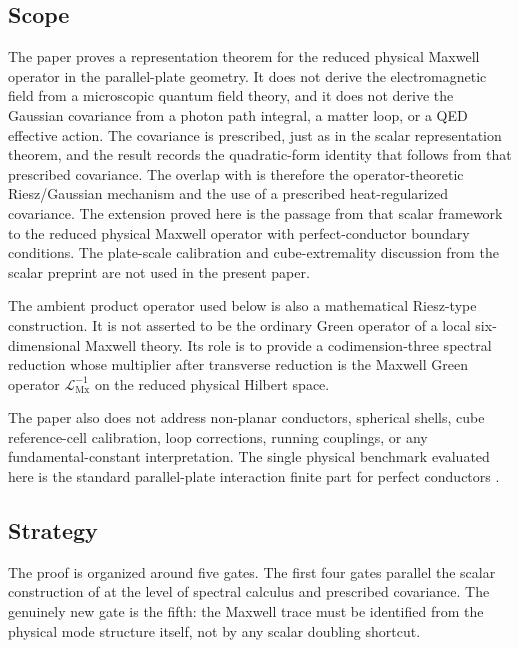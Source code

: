\documentclass[11pt]{article}
\providecommand{\LMx}{\mathcal L_{\mathrm{Mx}}}
\numberwithin{equation}{section}
\begin{document}
\subsection{Scope}
\label{subsec:scope}

The paper proves a representation theorem for the reduced physical Maxwell
operator in the parallel-plate geometry.  It does not derive the electromagnetic
field from a microscopic quantum field theory, and it does not derive the
Gaussian covariance from a photon path integral, a matter loop, or a QED
effective action.  The covariance is prescribed, just as in the scalar
representation theorem, and the result records the quadratic-form identity that
follows from that prescribed covariance.
The overlap with \cite{KhanKhan2026Scalar} is therefore the operator-theoretic
Riesz/Gaussian mechanism and the use of a prescribed heat-regularized
covariance.  The extension proved here is the passage from that scalar
framework to the reduced physical Maxwell operator with perfect-conductor
boundary conditions.  The plate-scale calibration and cube-extremality
discussion from the scalar preprint are not used in the present paper.

The ambient product operator used below is also a mathematical Riesz-type
construction.  It is not asserted to be the ordinary Green operator of a local
six-dimensional Maxwell theory.  Its role is to provide a codimension-three
spectral reduction whose multiplier after transverse reduction is the Maxwell Green
operator \(\LMx^{-1}\) on the reduced physical Hilbert space.

The paper also does not address non-planar conductors, spherical shells, cube
reference-cell calibration, loop corrections, running couplings, or any
fundamental-constant interpretation.  The single physical benchmark evaluated
here is the standard parallel-plate interaction finite part for perfect
conductors \cite{Casimir1948,Bordag2009}.

\subsection{Strategy}
\label{subsec:introduction-strategy}

The proof is organized around five gates.
The first four gates parallel the scalar construction of
\cite{KhanKhan2026Scalar} at the level of spectral calculus and prescribed
covariance.  The genuinely new gate is the fifth: the Maxwell trace must be
identified from the physical mode structure itself, not by any scalar doubling
shortcut.
\end{document}
